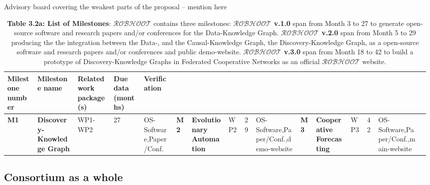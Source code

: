 \documentclass[11pt, a4paper]{article} %
\begin{document}
Advisory board covering the weakest parts of the proposal -- mention here



\begin{table}[h!]
\begin{center}
  \begin{tabular}{|m{1.75cm} || m{2.5cm} || m{2.5cm} || m{2.4cm} || m{6cm}|}
   \hline\hline
   \hline\hline
  {\bf Milestone number} & {\bf Milestone name} & {\bf Related work package(s)} & {\bf Due data (months)} & {\bf Verification} \\
  \hline\hline
  {\bf M1} & {\bf Discovery-Knowledge Graph}  & WP1-WP2 & 27 & OS-Software,Paper/Conf. &
  \hline\hline
  {\bf M2} & {\bf Evolutionary Automation} & WP2 & 29 & OS-Software,Paper/Conf.,demo-website &
  \hline\hline
  {\bf M3} & {\bf Cooperative Forecasting} & WP3 & 42 & OS-Software,Paper/Conf.,main-website &
  \hline\hline
\hline\hline
  \end{tabular}
\end{center}
\caption*{{{\bf Table 3.2a: List of Milestones}: {\bf $\mathcal{ROBHOOT}$} contains
    three milestones: {\bf $\mathcal{ROBHOOT}$ v.1.0} span from Month
    3 to 27 to generate open-source software and research papers
    and/or conferences for the Data-Knowledge Graph. {\bf
      $\mathcal{ROBHOOT}$ v.2.0} span from Month 5 to 29 producing the
    the integration between the Data-, and the Causal-Knowledge Graph,
    the Discovery-Knowledge Graph, as a open-source software and
    research papers and/or conferences and public demo-website. {\bf
      $\mathcal{ROBHOOT}$ v.3.0} span from Month 18 to 42 to build a
    prototype of Discovery-Knowledge Graphs in Federated Cooperative
    Networks as an official {\bf $\mathcal{ROBHOOT}$} website.}}
\end{table}

  \subsection{Consortium as a whole}
\end{document}
